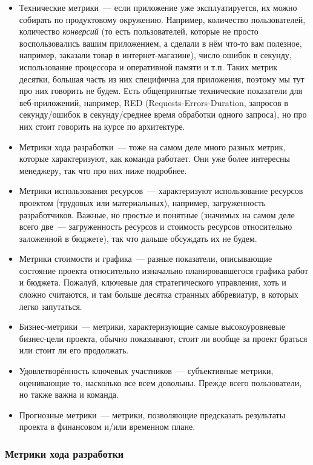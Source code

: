 \documentclass{../../text-style}
\begin{document}
\begin{itemize}
    \item Технические метрики~--- если приложение уже эксплуатируется, их можно собирать по продуктовому окружению. Например, количество пользователей, количество \emph{конверсий} (то есть пользователей, которые не просто воспользовались вашим приложением, а сделали в нём что-то вам полезное, например, заказали товар в интернет-магазине), число ошибок в секунду, использование процессора и оперативной памяти и т.п. Таких метрик десятки, большая часть из них специфична для приложения, поэтому мы тут про них говорить не будем. Есть общепринятые технические показатели для веб-приложений, например, RED (Requests-Errors-Duration, запросов в секунду/ошибок в секунду/среднее время обработки одного запроса), но про них стоит говорить на курсе по архитектуре.
    \item Метрики хода разработки~--- тоже на самом деле много разных метрик, которые характеризуют, как команда работает. Они уже более интересны менеджеру, так что про них ниже подробнее.
    \item Метрики использования ресурсов~--- характеризуют использование ресурсов проектом (трудовых или материальных), например, загруженность разработчиков. Важные, но простые и понятные (значимых на самом деле всего две~--- загруженность ресурсов и стоимость ресурсов относительно заложенной в бюджете), так что дальше обсуждать их не будем.
    \item Метрики стоимости и графика~--- разные показатели, описывающие состояние проекта относительно изначально планировавшегося графика работ и бюджета. Пожалуй, ключевые для стратегического управления, хоть и сложно считаются, и там больше десятка странных аббревиатур, в которых легко запутаться.
    \item Бизнес-метрики~--- метрики, характеризующие самые высокоуровневые бизнес-цели проекта, обычно показывают, стоит ли вообще за проект браться или стоит ли его продолжать.
    \item Удовлетворённость ключевых участников~--- субъективные метрики, оценивающие то, насколько все всем довольны. Прежде всего пользователи, но также важна и команда.
    \item Прогнозные метрики~--- метрики, позволяющие предсказать результаты проекта в финансовом и/или временном плане.
\end{itemize}

\subsubsection{Метрики хода разработки}
\end{document}
